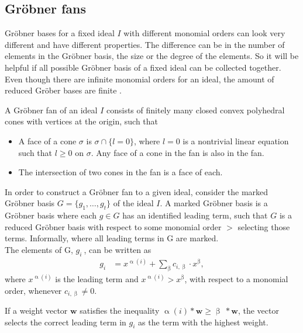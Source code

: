 \subsection{Gröbner fans}
\label{subsec:Groebnerfan}
 Gröbner bases for a fixed ideal $I$ with different monomial orders can look very different and have different properties. The difference can be in the number of elements in the Gröbner basis, the size or the degree of the elements. So it will be helpful if all 
possible Gröbner basis of a fixed ideal can be collected together.\\
Even though there are infinite monomial orders for an ideal, the amount of reduced Gröber bases are finite \cite{coxOshea}. 
 
\begin{env_definition}
\cite{coxOshea} A Gröbner fan of an ideal $I$ consists of finitely many closed convex polyhedral cones with vertices at the origin, such that

\begin{itemize}
\item
A face of a cone $\sigma$ is $\sigma \cap \lbrace l=0\rbrace$, where $l=0$ is a nontrivial linear equation such that $l \geq 0$ on $\sigma$.
Any face of a cone in the fan is also in the fan.
\item
The intersection of two cones in the fan is a face of each.
\end{itemize}

\end{env_definition}

In order to construct a Gröbner fan to a given ideal, consider the marked Gröbner basis $G = \lbrace g_{1},\dots,g_{t}\rbrace $ of the ideal $I$.
A marked Gröbner basis is a Gröbner basis where each $g \in G$ has an identified leading term, such that $G$ is a reduced Gröbner basis with respect to some monomial order $>$ selecting those terms.
Informally, where all leading terms in G are marked.\\
\newline
The elements of G, $g_{i}~$, can be written as
\begin{align*}
 g_{i} &  = x^{\upalpha\left( i\right) } +  \sum_{\upbeta} c_{i,\upbeta} \cdot x^{\upbeta}, 
\end{align*}
where $ x^{\upalpha\left( i\right) }$ is the leading term and $ x^{\upalpha\left( i\right) } > x^{\upbeta} $, with respect to a monomial order, whenever $c_{i,\upbeta} \neq 0 $.

If a weight vector $\textbf{w}$ satisfies the inequality
$\upalpha\left( i\right) \ast \textbf{w} \geq \upbeta~\ast\textbf{w}$, the vector selects the correct leading term in $g_{i}$ as the term with the highest weight.\\

